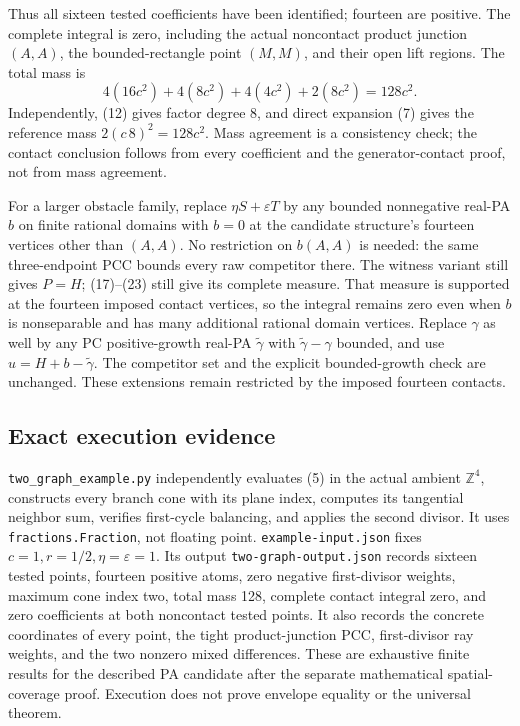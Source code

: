 \documentclass[
  10pt,
]{article}
\begin{document}
Thus all sixteen tested coefficients have been identified; fourteen are
positive. The complete integral is zero, including the actual noncontact
product junction \((A,A)\), the bounded-rectangle point \((M,M)\), and
their open lift regions. The total mass is \[
 4(16c^2)+4(8c^2)+4(4c^2)+2(8c^2)=128c^2.                  \tag{23}
\] Independently, (12) gives factor degree \(8\), and direct expansion
(7) gives the reference mass \(2(c\,8)^2=128c^2\). Mass agreement is a
consistency check; the contact conclusion follows from every coefficient
and the generator-contact proof, not from mass agreement.

For a larger obstacle family, replace \(\eta S+\varepsilon T\) by any
bounded nonnegative real-PA \(b\) on finite rational domains with
\(b=0\) at the candidate structure's fourteen vertices other than
\((A,A)\). No restriction on \(b(A,A)\) is needed: the same
three-endpoint PCC bounds every raw competitor there. The witness
variant still gives \(P=H\); (17)--(23) still give its complete measure.
That measure is supported at the fourteen imposed contact vertices, so
the integral remains zero even when \(b\) is nonseparable and has many
additional rational domain vertices. Replace \(\gamma\) as well by any
PC positive-growth real-PA \(\widetilde\gamma\) with
\(\widetilde\gamma-\gamma\) bounded, and use \(u=H+b-\widetilde\gamma\).
The competitor set and the explicit bounded-growth check are unchanged.
These extensions remain restricted by the imposed fourteen contacts.

\subsection{Exact execution evidence}\label{exact-execution-evidence}

\texttt{two\_graph\_example.py} independently evaluates (5) in the
actual ambient \(\mathbb{Z}^4\), constructs every branch cone with its
plane index, computes its tangential neighbor sum, verifies first-cycle
balancing, and applies the second divisor. It uses
\texttt{fractions.Fraction}, not floating point.
\texttt{example-input.json} fixes \(c=1,r=1/2,\eta=\varepsilon=1\). Its
output \texttt{two-graph-output.json} records sixteen tested points,
fourteen positive atoms, zero negative first-divisor weights, maximum
cone index two, total mass 128, complete contact integral zero, and zero
coefficients at both noncontact tested points. It also records the
concrete coordinates of every point, the tight product-junction PCC,
first-divisor ray weights, and the two nonzero mixed differences. These
are exhaustive finite results for the described PA candidate after the
separate mathematical spatial-coverage proof. Execution does not prove
envelope equality or the universal theorem.
\end{document}
